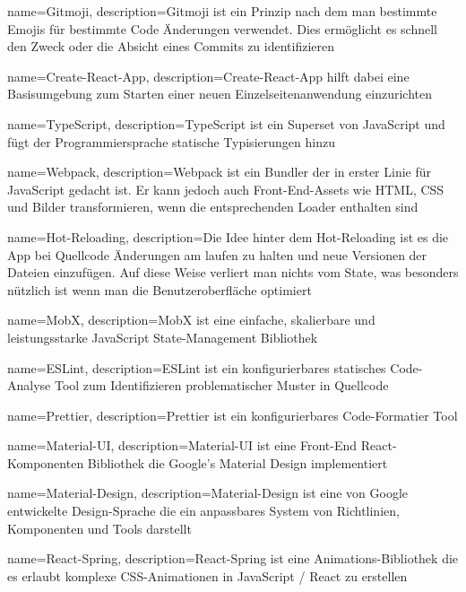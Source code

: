 {   name={Gitmoji},
    description={Gitmoji ist ein Prinzip nach dem man bestimmte Emojis für bestimmte Code Änderungen verwendet. Dies ermöglicht es schnell den Zweck oder die Absicht eines Commits zu identifizieren}
}

{   name={Create-React-App},
    description={Create-React-App hilft dabei eine Basisumgebung zum Starten einer neuen Einzelseitenanwendung einzurichten}
}

{   name={TypeScript},
    description={TypeScript ist ein Superset von JavaScript und fügt der Programmiersprache statische Typisierungen hinzu}
}

{   name={Webpack},
    description={Webpack ist ein Bundler der in erster Linie für JavaScript gedacht ist. Er kann jedoch auch Front-End-Assets wie HTML, CSS und Bilder transformieren, wenn die entsprechenden Loader enthalten sind}
}

{   name={Hot-Reloading},
    description={Die Idee hinter dem Hot-Reloading ist es die App bei Quellcode Änderungen am laufen zu halten und neue Versionen der Dateien einzufügen. Auf diese Weise verliert man nichts vom State, was besonders nützlich ist wenn man die Benutzeroberfläche optimiert}
}

{   name={MobX},
    description={MobX ist eine einfache, skalierbare und leistungsstarke JavaScript State-Management Bibliothek}
}

{   name={ESLint},
    description={ESLint ist ein konfigurierbares statisches Code-Analyse Tool zum Identifizieren problematischer Muster in Quellcode}
}

{   name={Prettier},
    description={Prettier ist ein konfigurierbares Code-Formatier Tool}
}

{   name={Material-UI},
    description={Material-UI ist eine Front-End React-Komponenten Bibliothek die Google's Material Design implementiert}
}

{   name={Material-Design},
    description={Material-Design ist eine von Google entwickelte Design-Sprache die ein anpassbares System von Richtlinien, Komponenten und Tools darstellt}
}

{   name={React-Spring},
    description={React-Spring ist eine Animations-Bibliothek die es erlaubt komplexe CSS-Animationen in JavaScript / React zu erstellen}
}

